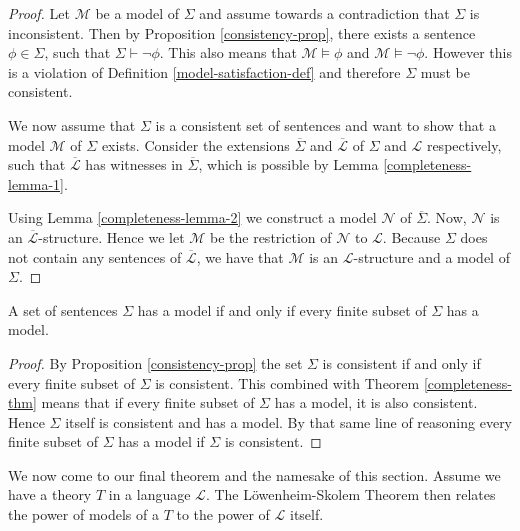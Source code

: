 \documentclass[../../main.tex]{subfiles}
\begin{document}
\begin{proof}
    Let $\mathcal{M}$ be a model of $\Sigma$ and assume towards a contradiction that $\Sigma$ is inconsistent.
    Then by Proposition \ref{consistency-prop}, there exists a sentence $\phi \in \Sigma$, such that $\Sigma \vdash \lnot\phi$.
    This also means that $\mathcal{M} \models \phi$ and $\mathcal{M} \models \lnot \phi$.
    However this is a violation of Definition \ref{model-satisfaction-def} and therefore $\Sigma$ must be consistent.

    We now assume that $\Sigma$ is a consistent set of sentences and want to show that a model $\mathcal{M}$ of $\Sigma$ exists.
    Consider the extensions $\overline{\Sigma}$ and $\overline{\mathcal{L}}$ of $\Sigma$ and $\mathcal{L}$ respectively,
    such that $\overline{\mathcal{L}}$ has witnesses in $\overline{\Sigma}$, which is possible by Lemma \ref{completeness-lemma-1}.

    Using Lemma \ref{completeness-lemma-2} we construct a model $\mathcal{N}$ of $\overline{\Sigma}$.
    Now, $\mathcal{N}$ is an $\overline{\mathcal{L}}$-structure.
    Hence we let $\mathcal{M}$ be the restriction of $\mathcal{N}$ to $\mathcal{L}$.
    Because $\Sigma$ does not contain any sentences of $\overline{\mathcal{L}}$,
    we have that $\mathcal{M}$ is an $\mathcal{L}$-structure and a model of $\Sigma$.
\end{proof}

\begin{theorem}\label{compactness-thm}\cite[Theorem 1.3.22]{Cha90}
    A set of sentences $\Sigma$ has a model if and only if every finite subset of $\Sigma$ has a model.
\end{theorem}

\begin{proof}
    By Proposition \ref{consistency-prop} the set $\Sigma$ is consistent if and only if every finite subset of $\Sigma$ is consistent.
    This combined with Theorem \ref{completeness-thm} means that if every finite subset of $\Sigma$ has a model, it is also consistent.
    Hence $\Sigma$ itself is consistent and has a model.
    By that same line of reasoning every finite subset of $\Sigma$ has a model if $\Sigma$ is consistent.
\end{proof}

We now come to our final theorem and the namesake of this section.
Assume we have a theory $T$ in a language $\mathcal{L}$.
The Löwenheim-Skolem Theorem then relates the power of models of a $T$ to the power of $\mathcal{L}$ itself.
\end{document}
